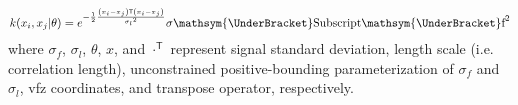\begin{equation} \label{eq:squared-exponential}
	k(x_i,x_j|\theta )=e^{-\frac{1}{2}\frac{\left(x_i-x_j\right)\mathsf{T}\left(x_i-x_j\right)}{\sigma _l{}^2}} \text{$\sigma \mathsym{\UnderBracket}$Subscript$\mathsym{\UnderBracket}$f}^2
\end{equation}
where $\sigma _f$, $\sigma _l$, $\theta$, $x$, and $\cdot ^{\mathsf{T}}$ represent signal standard deviation, length scale (i.e. correlation length), unconstrained positive-bounding parameterization of $\sigma _f$ and $\sigma _l$, \gls{vfz} coordinates, and transpose operator, respectively.